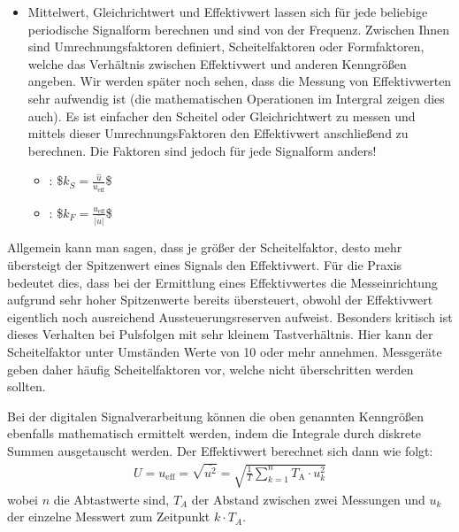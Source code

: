 \documentclass[letterpaper,10pt,english]{jupyterBook}
\begin{document}
\begin{itemize}
\item {} 
\sphinxAtStartPar
Mittelwert, Gleichrichtwert und Effektivwert lassen sich für jede beliebige periodische Signalform berechnen und sind  von der Frequenz. Zwischen Ihnen sind Umrechnungsfaktoren definiert, Scheitelfaktoren oder Formfaktoren, welche das Verhältnis zwischen Effektivwert und anderen Kenngrößen angeben. Wir werden später noch sehen, dass die Messung von Effektivwerten sehr aufwendig ist (die mathematischen Operationen im Intergral zeigen dies auch). Es ist einfacher den Scheitel\sphinxhyphen{} oder Gleichrichtwert zu messen und mittels dieser Umrechnungs\sphinxhyphen{}Faktoren den Effektivwert anschließend zu berechnen. Die Faktoren sind jedoch für jede Signalform anders!
\begin{itemize}
\item {} 
\sphinxAtStartPar
{}:
\$\(k_S = \frac{\hat u}{u_\mathrm{eff}}\)\$

\item {} 
\sphinxAtStartPar
{}:
\$\(k_F = \frac{u_\mathrm{eff}}{\overline{|u|}}\)\$

\end{itemize}

\end{itemize}

\sphinxAtStartPar
Allgemein kann man sagen, dass je größer der Scheitelfaktor, desto mehr übersteigt der Spitzenwert eines Signals den Effektivwert. Für die Praxis bedeutet dies, dass bei der Ermittlung eines Effektivwertes die Messeinrichtung aufgrund sehr hoher Spitzenwerte bereits übersteuert, obwohl der Effektivwert eigentlich noch ausreichend Aussteuerungsreserven aufweist. Besonders kritisch ist dieses Verhalten bei Pulsfolgen mit sehr kleinem Tastverhältnis. Hier kann der Scheitelfaktor unter Umständen Werte von 10 oder mehr annehmen. Messgeräte geben daher häufig Scheitelfaktoren vor, welche nicht überschritten werden sollten.

\sphinxAtStartPar
Bei der digitalen Signalverarbeitung können die oben genannten Kenngrößen ebenfalls mathematisch ermittelt werden, indem die Integrale durch diskrete Summen ausgetauscht werden. Der Effektivwert  berechnet sich dann wie folgt:
\begin{equation*}
\begin{split}U = u_\mathrm{eff} = \sqrt{\overline{u^2}} = \sqrt{\frac{1}{T}\sum_{k = 1}^{n}T_\mathrm A \cdot  u_k^2}\end{split}
\end{equation*}
\sphinxAtStartPar
wobei \(n\) die Abtastwerte sind, \(T_A\) der Abstand zwischen zwei Messungen und \(u_k\) der einzelne Messwert zum Zeitpunkt \(k\cdot T_A\).
\end{document}

